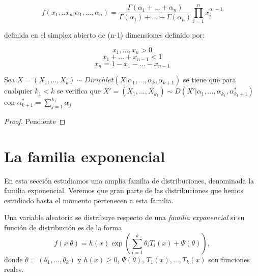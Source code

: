 \documentclass{article}
\newcommand{\importsection}[1]{}           %
\begin{document}
		\begin{equation*}
		f(x_1, .. x_n|\alpha_1, ...,\alpha_n) = \frac{\Gamma(\alpha_1 + ... + \alpha_n)}{\Gamma(\alpha_1) + ... + \Gamma(\alpha_n)} \prod_{i=1}^{n} {x_i ^ {\alpha_i - 1}}
		\end{equation*}

		definida en el simplex abierto de (n-1) dimensiones definido por:

		\begin{equation*}
		x_1, ... , x_n > 0
		\end{equation*}
		\begin{equation*}
		x_1 + ... + x_{n-1} < 1
		\end{equation*}
		\begin{equation*}
		x_n =  1 - x_1 - ... - x_{n-1}
		\end{equation*}

		\begin{thm}
			Sea $X = (X_1, ... , X_k) \sim Dirichlet(X|\alpha_1, ... , \alpha_k, \alpha_{k+1}) $ se tiene que para cualquier $k_1 < k$  se verifica que $X' =  (X_1, ... , X_{k_1}) \sim D(X'|\alpha_1, ... , \alpha_{k_1}, \alpha_{k_1 + 1}^{*}) $ con  $\alpha_{k+1}^{*} =\sum_{j=1}^{k_1} {\alpha_{j}}$
		\end{thm}

		\begin{proof}
			Pendiente
		\end{proof}
\importsection{Estimacion.tex}

\section{La familia exponencial}

    En esta sección estudiamos una amplia familia de distribuciones, denominada la familia exponencial. Veremos que gran parte de las distribuciones que hemos estudiado hasta el momento pertenecen a esta familia.

    \begin{definition}
        Una variable aleatoria se distribuye respecto de una \emph{familia exponencial} si su función de distribución es de la forma
        \begin{equation} \label{eq:exponencial}
            f(x | \theta) = h(x) \exp\left(\sum^k_{i=1} \theta_i T_i(x)  + \Psi (\theta)\right),
        \end{equation}
        donde $\theta = (\theta_1, \ldots, \theta_k)$ y $h(x) \ge 0$, $\Psi(\theta)$, $T_1(x), \ldots, T_k(x)$ son funciones reales.
    \end{definition}
\end{document}
